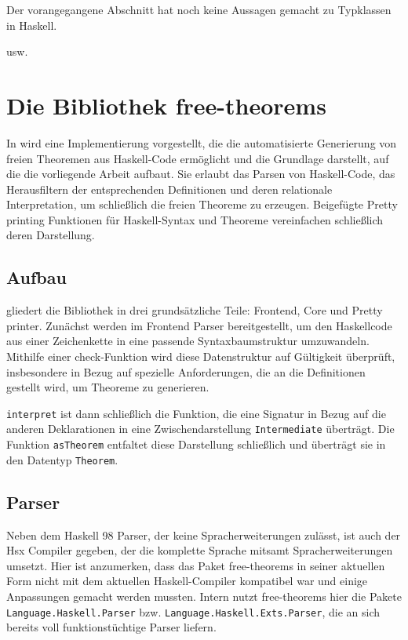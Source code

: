 \documentclass[11pt]{article} %
\begin{document}
Der vorangegangene Abschnitt hat noch keine Aussagen gemacht zu Typklassen in Haskell.

usw.

\section{Die Bibliothek free-theorems}

In \cite{freetheorems} wird eine Implementierung vorgestellt, die die automatisierte Generierung von freien Theoremen aus
Haskell-Code ermöglicht und die Grundlage darstellt, auf die die vorliegende Arbeit aufbaut.
Sie erlaubt das Parsen von Haskell-Code, das Herausfiltern der entsprechenden Definitionen und deren relationale
Interpretation, um schließlich die freien Theoreme zu erzeugen.
Beigefügte Pretty printing Funktionen für Haskell-Syntax und Theoreme vereinfachen schließlich deren Darstellung.

\subsection{Aufbau}

\cite{freetheorems} gliedert die Bibliothek in drei grundsätzliche Teile:  Frontend, Core und Pretty printer. 
Zunächst werden im Frontend Parser bereitgestellt, um den Haskellcode aus einer Zeichenkette in eine passende Syntaxbaumstruktur umzuwandeln. Mithilfe einer check-Funktion
wird diese Datenstruktur auf Gültigkeit überprüft, insbesondere in Bezug auf spezielle Anforderungen, die an die Definitionen gestellt wird, um Theoreme zu generieren.

\texttt{interpret} ist dann schließlich die Funktion, die eine Signatur in Bezug auf die anderen Deklarationen in eine Zwischendarstellung \texttt{Intermediate} überträgt. Die
Funktion \texttt{asTheorem} entfaltet diese Darstellung  schließlich und überträgt sie in den Datentyp \texttt{Theorem}.

\subsection{Parser}

Neben dem Haskell 98 Parser, der keine  Spracherweiterungen zulässt, ist auch der Hsx Compiler gegeben, der die
komplette Sprache mitsamt Spracherweiterungen umsetzt. Hier ist anzumerken, dass das Paket free-theorems in seiner aktuellen Form
nicht mit dem aktuellen Haskell-Compiler kompatibel war und einige Anpassungen gemacht werden mussten. 
Intern nutzt free-theorems hier die Pakete \texttt{Language.Haskell.Parser} bzw. \texttt{Language.Haskell.Exts.Parser}, die an sich bereits voll funktionstüchtige Parser liefern.
\end{document}
